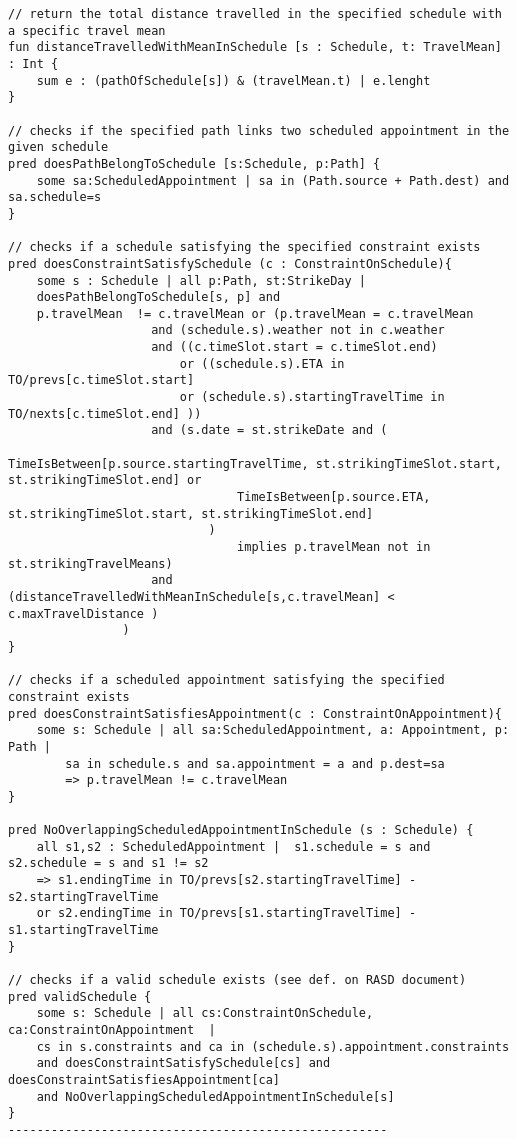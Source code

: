 \begin{lstlisting}
// return the total distance travelled in the specified schedule with a specific travel mean
fun distanceTravelledWithMeanInSchedule [s : Schedule, t: TravelMean] : Int {
	sum e : (pathOfSchedule[s]) & (travelMean.t) | e.lenght
}

// checks if the specified path links two scheduled appointment in the given schedule
pred doesPathBelongToSchedule [s:Schedule, p:Path] {
	some sa:ScheduledAppointment | sa in (Path.source + Path.dest) and sa.schedule=s
}

// checks if a schedule satisfying the specified constraint exists
pred doesConstraintSatisfySchedule (c : ConstraintOnSchedule){
	some s : Schedule | all p:Path, st:StrikeDay |
	doesPathBelongToSchedule[s, p] and
	p.travelMean  != c.travelMean or (p.travelMean = c.travelMean 
					and (schedule.s).weather not in c.weather 
					and ((c.timeSlot.start = c.timeSlot.end) 
						or ((schedule.s).ETA in TO/prevs[c.timeSlot.start]
						or (schedule.s).startingTravelTime in TO/nexts[c.timeSlot.end] ))
					and (s.date = st.strikeDate and (
								TimeIsBetween[p.source.startingTravelTime, st.strikingTimeSlot.start, st.strikingTimeSlot.end] or
								TimeIsBetween[p.source.ETA, st.strikingTimeSlot.start, st.strikingTimeSlot.end]
							)
								implies p.travelMean not in st.strikingTravelMeans)
					and (distanceTravelledWithMeanInSchedule[s,c.travelMean] < c.maxTravelDistance )
				)
}

// checks if a scheduled appointment satisfying the specified constraint exists
pred doesConstraintSatisfiesAppointment(c : ConstraintOnAppointment){
	some s: Schedule | all sa:ScheduledAppointment, a: Appointment, p: Path |
		sa in schedule.s and sa.appointment = a and p.dest=sa
		=> p.travelMean != c.travelMean
}

pred NoOverlappingScheduledAppointmentInSchedule (s : Schedule) {
	all s1,s2 : ScheduledAppointment |  s1.schedule = s and  s2.schedule = s and s1 != s2 
	=> s1.endingTime in TO/prevs[s2.startingTravelTime] - s2.startingTravelTime
	or s2.endingTime in TO/prevs[s1.startingTravelTime] - s1.startingTravelTime
}

// checks if a valid schedule exists (see def. on RASD document)
pred validSchedule {
	some s: Schedule | all cs:ConstraintOnSchedule, ca:ConstraintOnAppointment  | 
	cs in s.constraints and ca in (schedule.s).appointment.constraints
	and doesConstraintSatisfySchedule[cs] and doesConstraintSatisfiesAppointment[ca]
	and NoOverlappingScheduledAppointmentInSchedule[s]
}
-----------------------------------------------------


\end{lstlisting}

